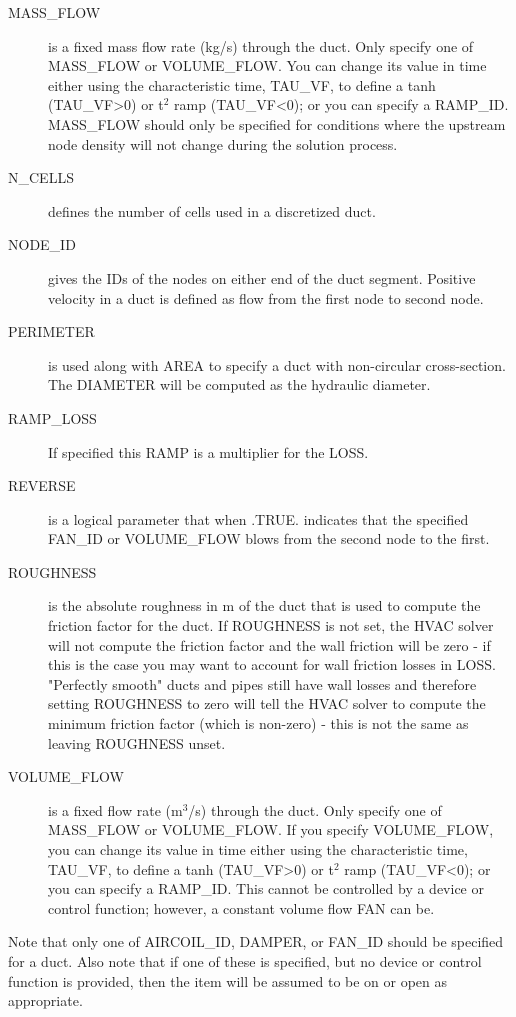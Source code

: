 \documentclass[11pt]{book}
\begin{document}
\begin{description}
\item[{\ct MASS\_FLOW}] is a fixed mass flow rate (kg/s) through the duct.  Only specify one of {\ct MASS\_FLOW} or {\ct VOLUME\_FLOW}.  You can change its value in time either using the characteristic time, {\ct TAU\_VF},  to define a tanh ({\ct TAU\_VF}>0) or t$^2$ ramp ({\ct TAU\_VF}<0); or you can specify a {\ct RAMP\_ID}.  {\ct MASS\_FLOW} should only be specified for conditions where the upstream node density will not change during the solution process.
\item[{\ct N\_CELLS}] defines the number of cells used in a discretized duct.
\item[{\ct NODE\_ID}] gives the {\ct ID}s of the nodes on either end of the duct segment.  Positive velocity in a duct is defined as flow from the first node to second node.
\item[{\ct PERIMETER}] is used along with {\ct AREA} to specify a duct with non-circular cross-section.  The {\ct DIAMETER} will be computed as the hydraulic diameter.
\item[{\ct RAMP\_LOSS}] If specified this {\ct RAMP} is a multiplier for the {\ct LOSS}.
\item[{\ct REVERSE}]  is a logical parameter that when {\ct .TRUE.} indicates that the specified {\ct FAN\_ID} or {\ct VOLUME\_FLOW} blows from the second node to the first.
\item[{\ct ROUGHNESS}] is the absolute roughness in m of the duct that is used to compute the friction factor for the duct. If {\ct ROUGHNESS} is not set, the HVAC solver will not compute the friction factor and the wall friction will be zero - if this is the case you may want to account for wall friction losses in {\ct LOSS}. "Perfectly smooth" ducts and pipes still have wall losses and therefore setting {\ct ROUGHNESS} to zero will tell the HVAC solver to compute the minimum friction factor (which is non-zero) - this is not the same as leaving {\ct ROUGHNESS} unset.
\item[{\ct VOLUME\_FLOW}] is a fixed flow rate (m$^3$/s) through the duct.  Only specify one of {\ct MASS\_FLOW} or {\ct VOLUME\_FLOW}. If you specify {\ct VOLUME\_FLOW}, you can change its value in time either using the characteristic time, {\ct TAU\_VF},  to define a tanh ({\ct TAU\_VF}>0) or t$^2$ ramp ({\ct TAU\_VF}<0); or you can specify a {\ct RAMP\_ID}.  This cannot be controlled by a device or control function; however, a constant volume flow {\ct FAN} can be.
\end{description}
Note that only one of {\ct AIRCOIL\_ID}, {\ct DAMPER}, or {\ct FAN\_ID} should be specified for a duct.  Also note that if one of these is specified, but no device or control function is provided, then the item will be assumed to be on or open as appropriate.
\end{document}
